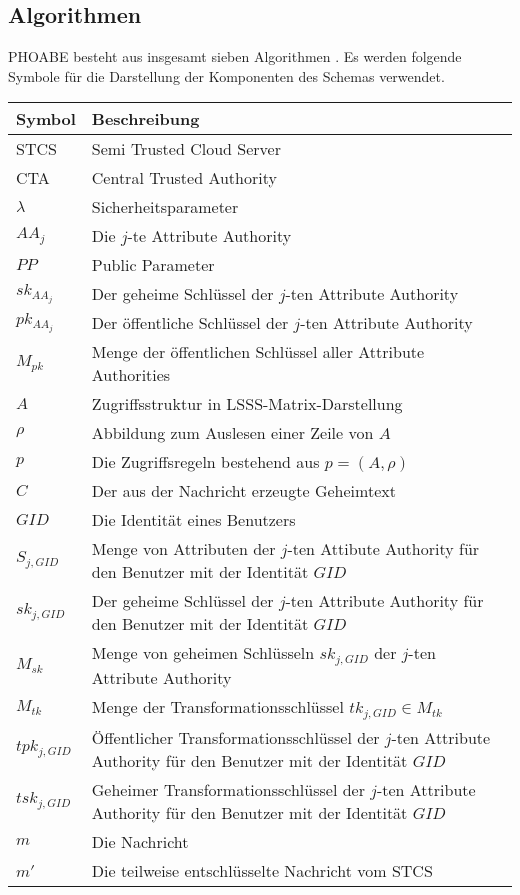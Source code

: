 \documentclass{hsflensburg}
\begin{document}
	\subsection{Algorithmen}
	PHOABE besteht aus insgesamt sieben Algorithmen \cite{phoabe}. Es werden
	folgende Symbole für die Darstellung der Komponenten des Schemas verwendet.

	\begin{center}
	\begin{small}
		\begin{tabular}{p{3cm}p{9cm}}
			\hline
			Symbol & Beschreibung \\
			\hline
			STCS & Semi Trusted Cloud Server \\
			CTA & Central Trusted Authority \\
			$\lambda$ & Sicherheitsparameter \\
			$AA_j$ & Die $j$-te Attribute Authority \\
			$PP$ & Public Parameter \\
			$sk_{AA_j}$ & Der geheime Schlüssel der $j$-ten Attribute Authority \\
			$pk_{AA_j}$ & Der öffentliche Schlüssel der $j$-ten Attribute Authority \\
			$M_{pk}$ & Menge der öffentlichen Schlüssel aller Attribute Authorities \\
			$A$ & Zugriffsstruktur in LSSS-Matrix-Darstellung \\
			$\rho$ & Abbildung zum Auslesen einer Zeile von $A$ \\
			$p$ & Die Zugriffsregeln bestehend aus $p = \left(A, \rho\right)$ \\
			$C$ & Der aus der Nachricht erzeugte Geheimtext \\
			$GID$ & Die Identität eines Benutzers \\
			$S_{j, GID}$ & Menge von Attributen der $j$-ten Attibute Authority für den
			Benutzer mit der Identität $GID$ \\
			$sk_{j, GID}$ & Der geheime Schlüssel der $j$-ten Attribute Authority für
			den Benutzer mit der Identität $GID$ \\
			$M_{sk}$ & Menge von geheimen Schlüsseln $sk_{j, GID}$ der $j$-ten Attribute Authority \\
			$M_{tk}$ & Menge der Transformationsschlüssel $tk_{j, GID} \in M_{tk}$ \\
			$tpk_{j, GID}$ & Öffentlicher Transformationsschlüssel der $j$-ten
			Attribute Authority für den Benutzer mit der Identität $GID$ \\
			$tsk_{j, GID}$ & Geheimer Transformationsschlüssel der $j$-ten
			Attribute Authority für den Benutzer mit der Identität $GID$ \\
			$m$ & Die Nachricht \\
			$m'$ & Die teilweise entschlüsselte Nachricht vom STCS \\
			\hline
		\end{tabular}
	\end{small}
	\end{center}
\end{document}

